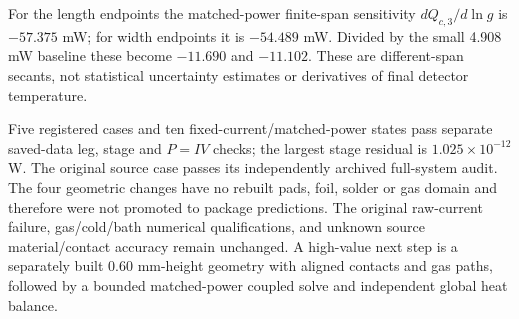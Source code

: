 
For the length endpoints the matched-power finite-span sensitivity $dQ_{c,3}/d\ln g$ is $-57.375$ mW; for width endpoints it is $-54.489$ mW. Divided by the small 4.908 mW baseline these become $-11.690$ and $-11.102$. These are different-span secants, not statistical uncertainty estimates or derivatives of final detector temperature.

Five registered cases and ten fixed-current/matched-power states pass separate saved-data leg, stage and $P=IV$ checks; the largest stage residual is $1.025\times10^{-12}$ W. The original source case passes its independently archived full-system audit. The four geometric changes have no rebuilt pads, foil, solder or gas domain and therefore were not promoted to package predictions. The original raw-current failure, gas/cold/bath numerical qualifications, and unknown source material/contact accuracy remain unchanged. A high-value next step is a separately built 0.60 mm-height geometry with aligned contacts and gas paths, followed by a bounded matched-power coupled solve and independent global heat balance.

